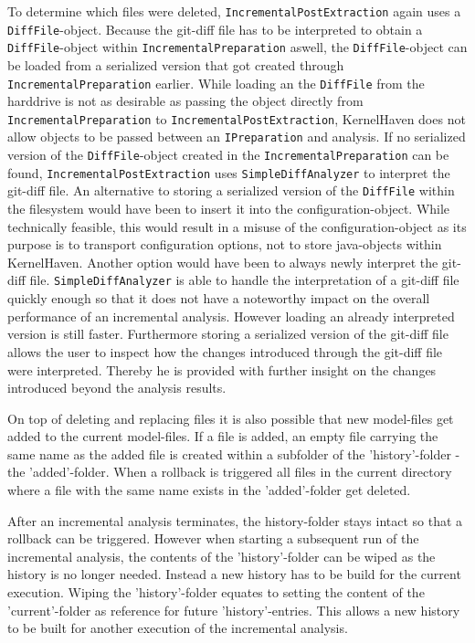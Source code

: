 \documentclass[a4paper]{article}
\begin{document}
To determine which files were deleted, \texttt{IncrementalPostExtraction} again uses a \texttt{DiffFile}-object. Because the git-diff file has to be interpreted to obtain a \texttt{DiffFile}-object within \texttt{IncrementalPreparation} aswell, the \texttt{DiffFile}-object can be loaded from a serialized version that got created through \texttt{IncrementalPreparation} earlier. While loading an the \texttt{DiffFile} from the harddrive is not as desirable as passing the object directly from \texttt{IncrementalPreparation} to \texttt{IncrementalPostExtraction}, KernelHaven does not allow objects to be passed between an \texttt{IPreparation} and analysis. If no serialized version of the \texttt{DiffFile}-object created in the \texttt{IncrementalPreparation} can be found, \texttt{IncrementalPostExtraction} uses \texttt{SimpleDiffAnalyzer} to interpret the git-diff file. An alternative to storing a serialized version of the \texttt{DiffFile} within the filesystem would have been to insert it into the configuration-object. While technically feasible, this would result in a misuse of the configuration-object as its purpose is to transport configuration options, not to store java-objects within KernelHaven. Another option would have been to always newly interpret the git-diff file. \texttt{SimpleDiffAnalyzer} is able to handle the interpretation of a git-diff file quickly enough so that it does not have a noteworthy impact on the overall performance of an incremental analysis. However loading an already interpreted version is still faster. Furthermore storing a serialized version of the git-diff file allows the user to inspect how the changes introduced through the git-diff file were interpreted. Thereby he is provided with further insight on the changes introduced beyond the analysis results.
 
 On top of deleting and replacing files it is also possible that new model-files get added to the current model-files. If a file is added, an empty file carrying the same name as the added file is created within a subfolder of the 'history'-folder - the 'added'-folder. When a rollback is triggered all files in the current directory where a file with the same name exists in the 'added'-folder get deleted.
 
After an incremental analysis terminates, the history-folder stays intact so that a rollback can be triggered. 
However when starting a subsequent run of the incremental analysis, the contents of the 'history'-folder can be wiped as the history is no longer needed. Instead a new history has to be build for the current execution. Wiping the 'history'-folder equates to setting the content of the 'current'-folder as reference for future 'history'-entries. This allows a new history to be built for another execution of the incremental analysis.
  
\end{document}

